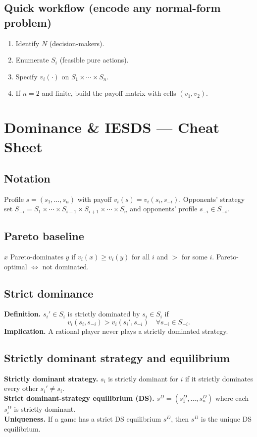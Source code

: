 \documentclass[10pt]{article}
\begin{document}
\subsection*{Quick workflow (encode any normal-form problem)}
\begin{enumerate}[label=\arabic*)]
  \item Identify $N$ (decision-makers).
  \item Enumerate $S_i$ (feasible pure actions).
  \item Specify $v_i(\cdot)$ on $S_1\times\cdots\times S_n$.
  \item If $n=2$ and finite, build the payoff matrix with cells $(v_1,v_2)$.
\end{enumerate}



\section*{Dominance \& IESDS — Cheat Sheet}

\subsection*{Notation}
Profile $s=(s_1,\dots,s_n)$ with payoff $v_i(s)=v_i(s_i,s_{-i})$. Opponents’ strategy set $S_{-i}=S_1\times\cdots\times S_{i-1}\times S_{i+1}\times\cdots\times S_n$ and opponents’ profile $s_{-i}\in S_{-i}$.

\subsection*{Pareto baseline}
$x$ Pareto-dominates $y$ if $v_i(x)\ge v_i(y)$ for all $i$ and $>$ for some $i$. Pareto-optimal $\iff$ not dominated.

\subsection*{Strict dominance}
\textbf{Definition.} $s_i'\in S_i$ is strictly dominated by $s_i\in S_i$ if
\[
v_i(s_i,s_{-i})>v_i(s_i',s_{-i})\quad \forall s_{-i}\in S_{-i}.
\]
\textbf{Implication.} A rational player never plays a strictly dominated strategy.

\subsection*{Strictly dominant strategy and equilibrium}
\textbf{Strictly dominant strategy.} $s_i$ is strictly dominant for $i$ if it strictly dominates every other $s_i'\neq s_i$.\\
\textbf{Strict dominant-strategy equilibrium (DS).} $s^D=(s^D_1,\dots,s^D_n)$ where each $s^D_i$ is strictly dominant.\\
\textbf{Uniqueness.} If a game has a strict DS equilibrium $s^D$, then $s^D$ is the unique DS equilibrium.
\end{document}
